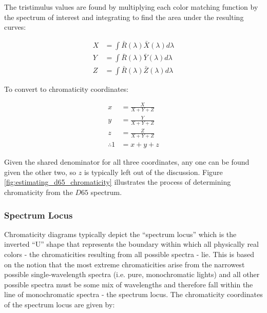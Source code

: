 \documentclass{article}
\begin{document}
\begin{multicols}{2}
The tristimulus values are found by multiplying each color matching function by the spectrum of interest and integrating to find the area under the resulting curves:

\begin{equation}\label{eq:tristimulus_from_spectrum} %
    \begin{aligned}
        X&=\int\bar{R}(\lambda)\bar{X}(\lambda)d\lambda\\
        Y&=\int\bar{R}(\lambda)\bar{Y}(\lambda)d\lambda\\
        Z&=\int\bar{R}(\lambda)\bar{Z}(\lambda)d\lambda
    \end{aligned}
\end{equation}

To convert to chromaticity coordinates:

\begin{equation}\label{eq:chromaticity_from_tristimulus} %
    \begin{aligned}
        x&=\frac{X}{X+Y+Z}\\
        y&=\frac{Y}{X+Y+Z}\\
        z&=\frac{Z}{X+Y+Z}\\
        \therefore 1&=x+y+z
    \end{aligned}
\end{equation}

Given the shared denominator for all three coordinates, any one can be found given the other two, so $z$ is typically left out of the discussion.  Figure \ref{fig:estimating_d65_chromaticity} illustrates the process of determining chromaticity from the $D65$ spectrum.

\subsubsection{Spectrum Locus} %

Chromaticity diagrams typically depict the “spectrum locus” which is the inverted “U” shape that represents the boundary within which all physically real colors - the chromaticities resulting from all possible spectra - lie.  This is based on the notion that the most extreme chromaticities arise from the narrowest possible single-wavelength spectra (i.e. pure, monochromatic lights) and all other possible spectra must be some mix of wavelengths and therefore fall within the line of monochromatic spectra - the spectrum locus.  The chromaticity coordinates of the spectrum locus are given by:


\end{multicols}
\end{document}
